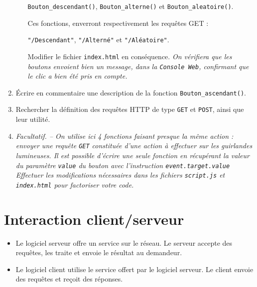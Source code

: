 \documentclass[a4paper]{article}
\begin{document}
\begin{enumerate}
\begin{enumerate}
	\begin{center}\texttt{Bouton_descendant()}, \texttt{Bouton_alterne()} et \texttt{Bouton_aleatoire()}.
	\end{center}

	Ces fonctions, enverront respectivement les requêtes GET :

	\begin{center}
	  \texttt{"/Descendant"}, \texttt{"/Alterné"} et \texttt{"/Aléatoire"}.
	\end{center}

	Modifier le fichier \verb|index.html| en conséquence. {\itshape On vérifiera que les boutons envoient bien un message, dans la \verb|Console Web|, confirmant que le clic a bien été pris en compte.}
    \end{enumerate}
  \item Écrire en commentaire une description de la fonction \texttt{Bouton_ascendant()}.
\item Rechercher la définition des requêtes HTTP de type \verb|GET| et \verb|POST|, ainsi que leur utilité.
\item {\itshape Facultatif. -- On utilise ici 4 fonctions faisant presque la même action : envoyer une requête \verb|GET| constituée d'une action à effectuer sur les guirlandes lumineuses.
  Il est possible d'écrire une seule fonction en récupérant la valeur du paramètre \texttt{value} du bouton avec l'instruction \texttt{event.target.value}\\
Effectuer les modifications nécessaires dans les fichiers \verb|script.js| et \verb|index.html| pour \og{}factoriser\fg{} votre code.}
\end{enumerate}

\pagebreak

\section{Interaction client/serveur}

\begin{itemize}
\item Le logiciel serveur offre un service sur le réseau. Le serveur accepte des requêtes, les traite et envoie le résultat au demandeur.
\item Le logiciel client utilise le service offert par le logiciel serveur. Le client envoie des requêtes et reçoit des réponses.
\end{itemize}
\end{document}
